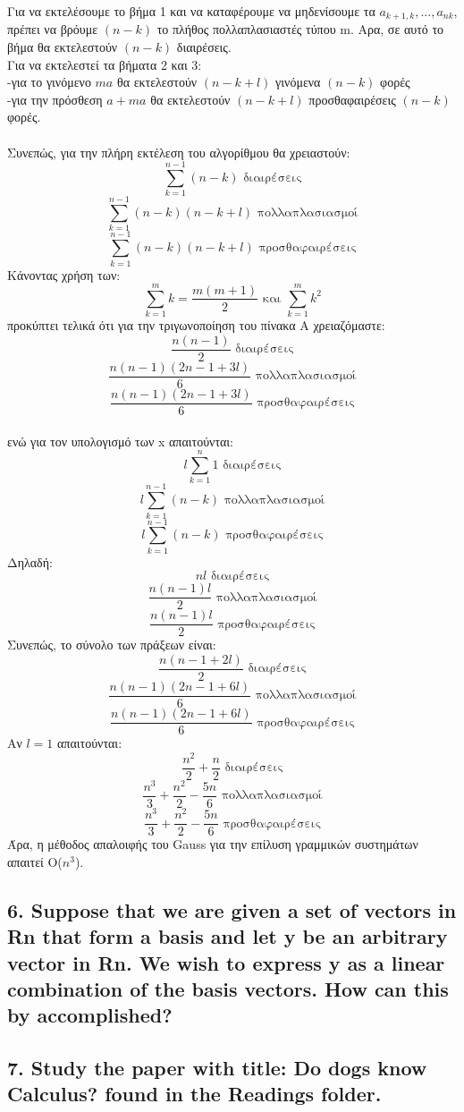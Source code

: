 \documentclass[12pt]{article}
\begin{document}
Για να εκτελέσουμε το βήμα 1 και να καταφέρουμε να μηδενίσουμε τα $a_{k+1,k},...,a_{nk}$, πρέπει να βρόυμε $(n-k)$ το πλήθος πολλαπλασιαστές τύπου m. Αρα, σε αυτό το βήμα θα εκτελεστούν $(n-k)$ διαιρέσεις. \\
Για να εκτελεστεί τα βήματα 2 και 3: \\
-για το γινόμενο $ma$ θα εκτελεστούν $(n-k+l)$ γινόμενα $(n-k)$ φορές    \\
-για την πρόσθεση $a+ma$ θα εκτελεστούν $(n-k+l)$ προσθαφαιρέσεις $(n-k)$ φορές. \\ \\
Συνεπώς, για την πλήρη εκτέλεση του αλγορίθμου θα χρειαστούν:
$$ \sum_{k=1}^{n-1} {(n-k)}	\mbox{	διαιρέσεις}$$
$$\sum_{k=1}^{n-1} {(n-k)(n-k+l)} \mbox{	πολλαπλασιασμοί} $$ 
$$\sum_{k=1}^{n-1} {(n-k)(n-k+l)} \mbox{	προσθαφαιρέσεις} $$  
Κάνοντας χρήση των: \\
$$
\sum_{k=1}^{m}k = \frac{m(m+1)}{2} \mbox{ και } \sum_{k=1}^{m}k^2
$$
προκύπτει τελικά ότι για την τριγωνοποίηση του πίνακα Α χρειαζόμαστε:
$$\frac{n(n-1)}{2} \mbox{ διαιρέσεις}$$
$$\frac{n(n-1)(2n-1+3l)}{6} \mbox{ πολλαπλασιασμοί}$$
$$ \frac{n(n-1)(2n-1+3l)}{6} \mbox{ προσθαφαιρέσεις}$$
\\ ενώ για τον υπολογισμό των x απαιτούνται:
$$ l\sum_{k=1}^{n}1 \mbox{ διαιρέσεις}$$
$$ l\sum_{k=1}^{n-1}{(n-k)} \mbox{ πολλαπλασιασμοί}$$
$$ l\sum_{k=1}^{n-1}{(n-k)} \mbox{ προσθαφαιρέσεις}$$
Δηλαδή:
$$ nl \mbox{ διαιρέσεις} $$
$$ \frac{n(n-1)l}{2} \mbox{ πολλαπλασιασμοί}$$
$$ \frac{n(n-1)l}{2} \mbox{ προσθαφαιρέσεις}$$
Συνεπώς, το σύνολο των πράξεων είναι:
$$ \frac{n(n-1+2l)}{2} \mbox{ διαιρέσεις} $$
$$ \frac{n(n-1)(2n-1+6l)}{6} \mbox{ πολλαπλασιασμοί}$$
$$ \frac{n(n-1)(2n-1+6l)}{6} \mbox{ προσθαφαιρέσεις}$$
Αν $l=1$ απαιτούνται:
$$ \frac{n^2}{2} + \frac{n}{2} \mbox{ διαιρέσεις}$$
$$ \frac{n^3}{3} + \frac{n^2}{2} - \frac{5n}{6} \mbox{ πολλαπλασιασμοί}$$
$$ \frac{n^3}{3} + \frac{n^2}{2} - \frac{5n}{6} \mbox{ προσθαφαιρέσεις}$$
Άρα, η μέθοδος απαλοιφής του Gauss για την επίλυση γραμμικών συστημάτων απαιτεί Ο($n^3$).
\vspace{2in}


\pagebreak

\subsection*{6. Suppose that we are given a set of vectors in Rn that form a basis and let y be an
arbitrary vector in Rn. We wish to express y as a linear combination of the basis vectors. How
can this by accomplished?}

\vspace{2in}


\pagebreak

\subsection*{7. Study the paper with title: Do dogs know Calculus? found in the Readings folder.}

\vspace{2in}
\end{document}
